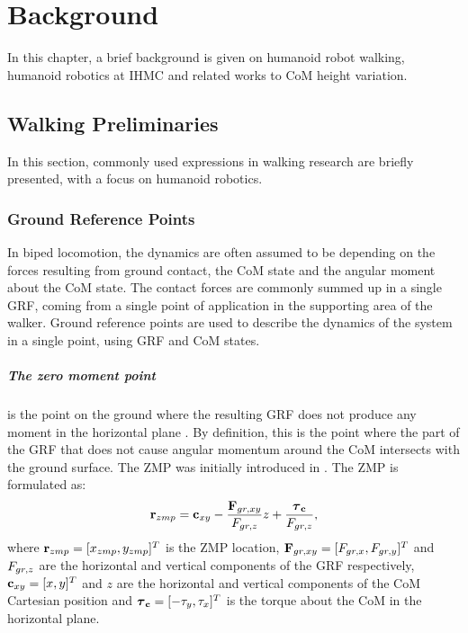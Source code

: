 %
\chapter{Background}\label{chap:background}
In this chapter, a brief background is given on humanoid robot walking, humanoid robotics at \ac{IHMC} and related works to \ac{CoM} height variation.
\section{Walking Preliminaries}
In this section, commonly used expressions in walking research are briefly presented, with a focus on humanoid robotics.
\subsection{Ground Reference Points}\label{sec:grp}
In biped locomotion, the dynamics are often assumed to be depending on the forces resulting from ground contact, the \ac{CoM} state and the angular moment about the \ac{CoM} state. The contact forces are commonly summed up in a single \ac{GRF}, coming from a single point of application in the supporting area of the walker. Ground reference points are used to describe the dynamics of the system in a single point, using \ac{GRF} and \ac{CoM} states.

\paragraph{The zero moment point} is the point on the ground where the resulting \ac{GRF} does not produce any moment in the horizontal plane \cite{sardain2004forces}. By definition, this is the point where the part of the \ac{GRF} that does not cause angular momentum around the \ac{CoM} intersects with the ground surface. The \ac{ZMP} was initially introduced in \cite{vukobratovic1969contribution}. The \ac{ZMP} is formulated as:
\begin{equation}
    \mathbf{r}_{zmp}=\mathbf{c}_{xy}-\frac{\mathbf{F}_{gr,xy}}{F_{gr,z}}z+\frac{\boldsymbol{\tau}_{\mathbf{c}}}{F_{gr,z}},
\end{equation}
where $\mathbf{r}_{zmp} = [x_{zmp}, y_{zmp}]^T$ is the \ac{ZMP} location, $\mathbf{F}_{gr,xy}=[F_{gr,x},F_{gr,y}]^T$ and $F_{gr,z}$ are the horizontal and vertical components of the \ac{GRF} respectively, $\mathbf{c}_{xy} = [x,y]^T$ and $z$ are the horizontal and vertical components of the \ac{CoM} Cartesian position and $\boldsymbol{\tau}_{\mathbf{c}} = [-\tau_y,\tau_x]^T$ is the torque about the \ac{CoM} in the horizontal plane. 

